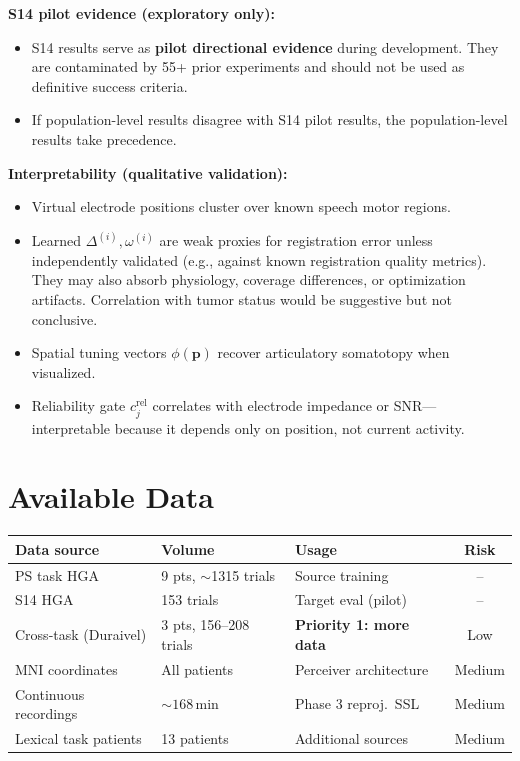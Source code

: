 \documentclass[11pt,letterpaper]{article}
\newcommand{\bfp}{\mathbf{p}}
\begin{document}
\textbf{S14 pilot evidence (exploratory only):}
\begin{itemize}[leftmargin=2em]
\item S14 results serve as \textbf{pilot directional evidence} during development. They are contaminated by 55+ prior experiments and should not be used as definitive success criteria.
\item If population-level results disagree with S14 pilot results, the population-level results take precedence.
\end{itemize}

\textbf{Interpretability (qualitative validation):}
\begin{itemize}[leftmargin=2em]
\item Virtual electrode positions cluster over known speech motor regions.
\item Learned $\Delta^{(i)}, \omega^{(i)}$ are weak proxies for registration error unless independently validated (e.g., against known registration quality metrics). They may also absorb physiology, coverage differences, or optimization artifacts. Correlation with tumor status would be suggestive but not conclusive.
\item Spatial tuning vectors $\phi(\bfp)$ recover articulatory somatotopy when visualized.
\item Reliability gate $c_j^{\text{rel}}$ correlates with electrode impedance or SNR---interpretable because it depends only on position, not current activity.
\end{itemize}


\section{Available Data}

\begin{table}[ht!]\centering\small
\begin{tabular}{@{}lllc@{}}
\toprule
\textbf{Data source} & \textbf{Volume} & \textbf{Usage} & \textbf{Risk} \\
\midrule
PS task HGA & 9 pts, ${\sim}$1315 trials & Source training & -- \\
S14 HGA & 153 trials & Target eval (pilot) & -- \\
Cross-task (Duraivel) & 3 pts, 156--208 trials & \textbf{Priority 1: more data} & Low \\
MNI coordinates & All patients & Perceiver architecture & Medium \\
Continuous recordings & ${\sim}168$\,min & Phase 3 reproj.\ SSL & Medium \\
Lexical task patients & 13 patients & Additional sources & Medium \\
\bottomrule
\end{tabular}
\end{table}
\end{document}
